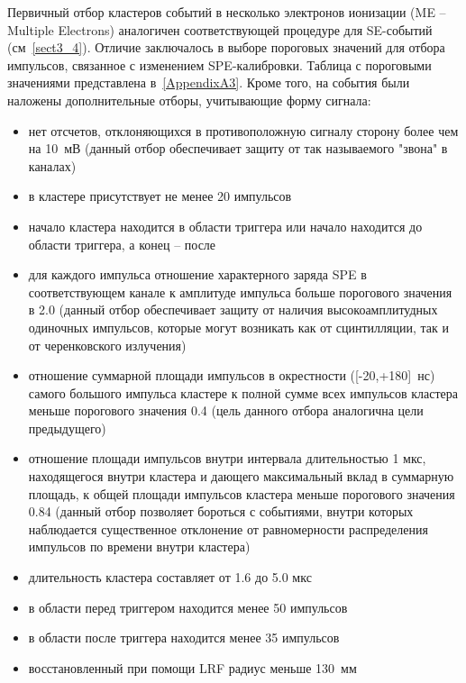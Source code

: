 Первичный отбор кластеров событий в несколько электронов ионизации (ME -- Multiple Electrons) аналогичен соответствующей процедуре для SE-событий (см~\ref{sect3_4}). Отличие заключалось в выборе пороговых значений для отбора импульсов, связанное с изменением SPE-калибровки. Таблица с пороговыми значениями представлена в~\ref{AppendixA3}. Кроме того, на события были наложены дополнительные отборы, учитывающие форму сигнала:
\begin{itemize}
    \item нет отсчетов, отклоняющихся в противоположную сигналу сторону более чем на 10~мВ (данный отбор обеспечивает защиту от так называемого "звона" в каналах)
    \item в кластере присутствует не менее 20 импульсов
    \item начало кластера находится в области триггера или начало находится до области триггера, а конец -- после
    \item для каждого импульса отношение характерного заряда SPE в соответствующем канале к амплитуде импульса больше порогового значения в 2.0 (данный отбор обеспечивает защиту от наличия высокоамплитудных одиночных импульсов, которые могут возникать как от сцинтилляции, так и от черенковского излучения)
    \item отношение суммарной площади импульсов в окрестности ([-20,+180]~нс) самого большого импульса кластере к полной сумме всех импульсов кластера меньше порогового значения 0.4 (цель данного отбора аналогична цели предыдущего)
    \item отношение площади импульсов внутри интервала длительностью 1 мкс, находящегося внутри кластера и дающего максимальный вклад в суммарную площадь, к общей площади импульсов кластера меньше порогового значения 0.84 (данный отбор позволяет бороться с событиями, внутри которых наблюдается существенное отклонение от равномерности распределения импульсов по времени внутри кластера)
    \item длительность кластера составляет от 1.6 до 5.0 мкс
    \item в области перед триггером находится менее 50 импульсов
    \item в области после триггера находится менее 35 импульсов
    \item восстановленный при помощи LRF радиус меньше 130~мм
\end{itemize}

